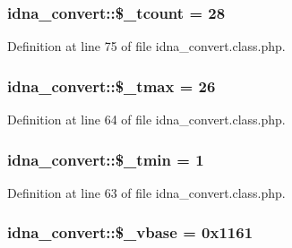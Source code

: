 \subsubsection[{\texorpdfstring{\$\+\_\+tcount}{$_tcount}}]{\setlength{\rightskip}{0pt plus 5cm}idna\+\_\+convert\+::\$\+\_\+tcount = 28\hspace{0.3cm}{\ttfamily [protected]}}\hypertarget{classidna__convert_a81a70a95e18fde08ec6633f0095c92c6}{}\label{classidna__convert_a81a70a95e18fde08ec6633f0095c92c6}


Definition at line 75 of file idna\+\_\+convert.\+class.\+php.

\subsubsection[{\texorpdfstring{\$\+\_\+tmax}{$_tmax}}]{\setlength{\rightskip}{0pt plus 5cm}idna\+\_\+convert\+::\$\+\_\+tmax = 26\hspace{0.3cm}{\ttfamily [protected]}}\hypertarget{classidna__convert_a44dfb166546f087150aa6c1ffdde2473}{}\label{classidna__convert_a44dfb166546f087150aa6c1ffdde2473}


Definition at line 64 of file idna\+\_\+convert.\+class.\+php.

\subsubsection[{\texorpdfstring{\$\+\_\+tmin}{$_tmin}}]{\setlength{\rightskip}{0pt plus 5cm}idna\+\_\+convert\+::\$\+\_\+tmin = 1\hspace{0.3cm}{\ttfamily [protected]}}\hypertarget{classidna__convert_a25ba1aab448cedd1159da1a09fb97720}{}\label{classidna__convert_a25ba1aab448cedd1159da1a09fb97720}


Definition at line 63 of file idna\+\_\+convert.\+class.\+php.

\subsubsection[{\texorpdfstring{\$\+\_\+vbase}{$_vbase}}]{\setlength{\rightskip}{0pt plus 5cm}idna\+\_\+convert\+::\$\+\_\+vbase = 0x1161\hspace{0.3cm}{\ttfamily [protected]}}\hypertarget{classidna__convert_a2e984a3fe1e2e4d5192dd9a5220e9c29}{}\label{classidna__convert_a2e984a3fe1e2e4d5192dd9a5220e9c29}



